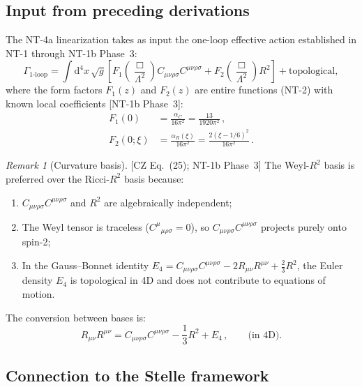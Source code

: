 \documentclass[12pt,a4paper]{article}
\theoremstyle{definition}
\theoremstyle{remark}
\newtheorem{remark}[proposition]{Remark}
\newcommand{\Ricsq}{R_{\mu\nu}R^{\mu\nu}}
\newcommand{\Weylsq}{C_{\mu\nu\rho\sigma}C^{\mu\nu\rho\sigma}}
\newcommand{\dd}{\mathrm{d}}
\newcommand{\fromlit}[1]{\textcolor{blue!70!black}{\textsf{[#1]}}}
\begin{document}
\subsection{Input from preceding derivations}

The NT-4a linearization takes as input the one-loop effective action
established in NT-1 through NT-1b Phase~3:
\begin{equation}
  \Gamma_{\text{1-loop}} = \int\dd^4x\,\sqrt{g}\left[
    F_1\!\left(\frac{\Box}{\Lambda^2}\right)\Weylsq
    + F_2\!\left(\frac{\Box}{\Lambda^2}\right)R^2
  \right] + \text{topological},
  \label{eq:effective-action}
\end{equation}
where the form factors $F_1(z)$ and $F_2(z)$ are entire functions
(NT-2) with known local coefficients \fromlit{NT-1b Phase~3}:
\begin{align}
  F_1(0) &= \frac{\alpha_C}{16\pi^2}
  = \frac{13}{1920\pi^2}\,,
    \label{eq:F1-zero}\\
  F_2(0;\xi) &= \frac{\alpha_R(\xi)}{16\pi^2}
  = \frac{2(\xi-1/6)^2}{16\pi^2}\,.
    \label{eq:F2-zero}
\end{align}

\begin{remark}[Curvature basis]
\label{rem:curvature-basis}
\fromlit{CZ Eq.~(25); NT-1b Phase~3}
The Weyl-$R^2$ basis is preferred over the Ricci-$R^2$ basis because:
\begin{enumerate}[nosep]
  \item $\Weylsq$ and $R^2$ are algebraically independent;
  \item The Weyl tensor is traceless ($C^\mu{}_{\mu\rho\sigma}=0$),
    so $\Weylsq$ projects purely onto spin-2;
  \item In the Gauss--Bonnet identity
    $E_4 = \Weylsq - 2\Ricsq + \frac{2}{3}R^2$, the Euler density
    $E_4$ is topological in 4D and does not contribute to
    equations of motion.
\end{enumerate}
The conversion between bases is:
\begin{equation}
  \Ricsq = \Weylsq - \frac{1}{3}R^2 + E_4\,,
  \qquad\text{(in 4D)}.
  \label{eq:basis-conversion}
\end{equation}
\end{remark}


\subsection{Connection to the Stelle framework}
\end{document}
